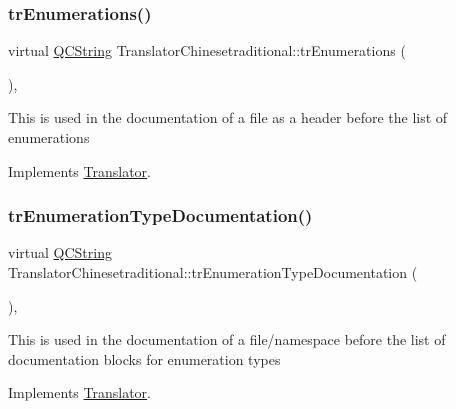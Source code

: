 \subsubsection{\texorpdfstring{trEnumerations()}{trEnumerations()}}
{\footnotesize\ttfamily virtual \mbox{\hyperlink{class_q_c_string}{Q\+C\+String}} Translator\+Chinesetraditional\+::tr\+Enumerations (\begin{DoxyParamCaption}{ }\end{DoxyParamCaption})\hspace{0.3cm}{\ttfamily [inline]}, {\ttfamily [virtual]}}

This is used in the documentation of a file as a header before the list of enumerations 

Implements \mbox{\hyperlink{class_translator}{Translator}}.

\mbox{\label{class_translator_chinesetraditional_aa761127e4fdb1b34969289831f7c817c}} 
\subsubsection{\texorpdfstring{trEnumerationTypeDocumentation()}{trEnumerationTypeDocumentation()}}
{\footnotesize\ttfamily virtual \mbox{\hyperlink{class_q_c_string}{Q\+C\+String}} Translator\+Chinesetraditional\+::tr\+Enumeration\+Type\+Documentation (\begin{DoxyParamCaption}{ }\end{DoxyParamCaption})\hspace{0.3cm}{\ttfamily [inline]}, {\ttfamily [virtual]}}

This is used in the documentation of a file/namespace before the list of documentation blocks for enumeration types 

Implements \mbox{\hyperlink{class_translator}{Translator}}.

\mbox{\label{class_translator_chinesetraditional_ab4f1b9601ba176651ff6aa46e9380fb0}} 
